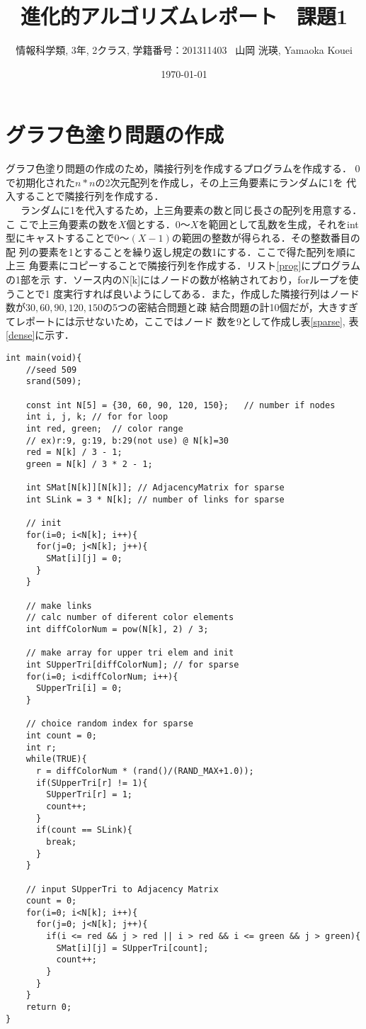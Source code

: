 \documentclass[a4j]{jarticle}
\title{進化的アルゴリズムレポート \ 課題1}
\author{情報科学類, 3年, 2クラス, 学籍番号：201311403 \ 山岡 洸瑛, Yamaoka
Kouei}
\date{\today}
\begin{document}
\maketitle

\section*{グラフ色塗り問題の作成}
グラフ色塗り問題の作成のため，隣接行列を作成するプログラムを作成する．
0で初期化された$n*n$の2次元配列を作成し，その上三角要素にランダムに1を
代入することで隣接行列を作成する．\\\ \ \ 
ランダムに1を代入するため，上三角要素の数と同じ長さの配列を用意する．こ
こで上三角要素の数を$X$個とする．$0〜X$を範囲として乱数を生成，それをint
型にキャストすることで$0〜(X-1)$の範囲の整数が得られる．その整数番目の配
列の要素を1とすることを繰り返し規定の数1にする．ここで得た配列を順に上三
角要素にコピーすることで隣接行列を作成する．リスト\ref{prog}にプログラムの1部を示
す．ソース内のN[k]にはノードの数が格納されており，forループを使うことで1
度実行すれば良いようにしてある．また，作成した隣接行列はノード数が$30, 60, 90, 120, 150$の5つの密結合問題と疎
結合問題の計10個だが，大きすぎてレポートには示せないため，ここではノード
数を9として作成し表\ref{sparse}, 表\ref{dense}に示す．

\begin{lstlisting}[caption=makeAdjecencyMatrix.c, label=prog, xleftmargin=1cm]
int main(void){
    //seed 509
    srand(509);

    const int N[5] = {30, 60, 90, 120, 150};   // number if nodes
    int i, j, k; // for for loop
    int red, green;  // color range
    // ex)r:9, g:19, b:29(not use) @ N[k]=30 
    red = N[k] / 3 - 1;
    green = N[k] / 3 * 2 - 1;

    int SMat[N[k]][N[k]]; // AdjacencyMatrix for sparse
    int SLink = 3 * N[k]; // number of links for sparse

    // init
    for(i=0; i<N[k]; i++){
      for(j=0; j<N[k]; j++){
        SMat[i][j] = 0;
      }
    }

    // make links
    // calc number of diferent color elements
    int diffColorNum = pow(N[k], 2) / 3;

    // make array for upper tri elem and init
    int SUpperTri[diffColorNum]; // for sparse
    for(i=0; i<diffColorNum; i++){
      SUpperTri[i] = 0;
    }

    // choice random index for sparse
    int count = 0;
    int r;
    while(TRUE){
      r = diffColorNum * (rand()/(RAND_MAX+1.0));
      if(SUpperTri[r] != 1){
        SUpperTri[r] = 1;
        count++;
      }
      if(count == SLink){
        break;
      }
    }

    // input SUpperTri to Adjacency Matrix
    count = 0;
    for(i=0; i<N[k]; i++){
      for(j=0; j<N[k]; j++){
        if(i <= red && j > red || i > red && i <= green && j > green){
          SMat[i][j] = SUpperTri[count];
          count++;
        }
      }
    }
    return 0;
}
\end{lstlisting}
\end{document}

